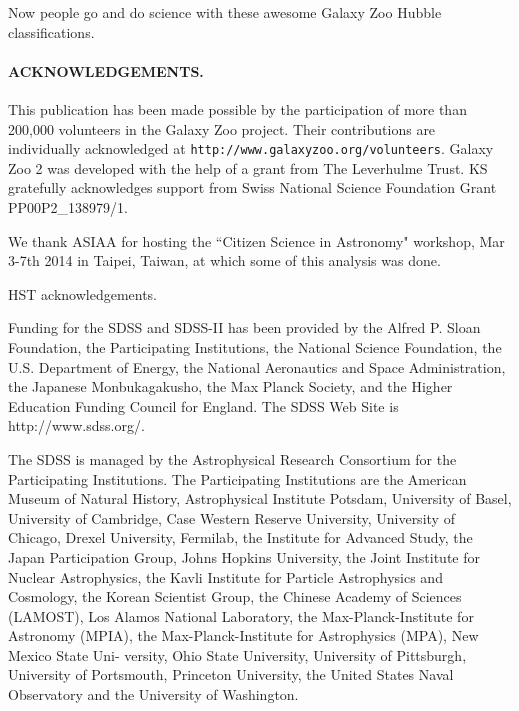 \documentclass[usenatbib]{mn2e}
\begin{document}
Now people go and do science with these awesome Galaxy Zoo Hubble classifications.  
 
 
\paragraph*{ACKNOWLEDGEMENTS.} 

This publication has been made possible by the participation of more than 200,000 volunteers in the Galaxy Zoo project. Their contributions are individually acknowledged at \texttt{http://www.galaxyzoo.org/volunteers}. Galaxy Zoo 2 was developed with the help of a grant from The Leverhulme Trust. KS gratefully acknowledges support from Swiss National Science Foundation Grant PP00P2\_138979/1.

We thank ASIAA for hosting the ``Citizen Science in Astronomy" workshop, Mar 3-7th 2014 in Taipei, Taiwan, at which some of this analysis was done. 

HST acknowledgements.

Funding for the SDSS and SDSS-II has been provided by the Alfred P. Sloan Foundation, the Participating Institutions, the National Science Foundation, the U.S. Department of Energy, the National Aeronautics and Space Administration, the Japanese Monbukagakusho, the Max Planck Society, and the Higher Education Funding Council for England. The SDSS Web Site is http://www.sdss.org/. 

The SDSS is managed by the Astrophysical Research Consortium for the Participating Institutions. The Participating Institutions are the American Museum of Natural History, Astrophysical  Institute Potsdam, University of Basel, University of Cambridge, 
Case Western Reserve University, University of Chicago, Drexel University, Fermilab, the Institute for Advanced Study, the Japan 
Participation Group, Johns Hopkins University, the Joint Institute for Nuclear Astrophysics, the Kavli Institute for Particle Astrophysics and Cosmology, the Korean Scientist Group, the Chinese Academy of Sciences (LAMOST), Los Alamos National Laboratory, the Max-Planck-Institute for Astronomy (MPIA), the Max-Planck-Institute for Astrophysics (MPA), New Mexico State Uni- 
versity, Ohio State University, University of Pittsburgh, University of Portsmouth, Princeton University, the United States Naval Observatory and the University of Washington. 


\begin{thebibliography}{}

\end{thebibliography}
\end{document}
